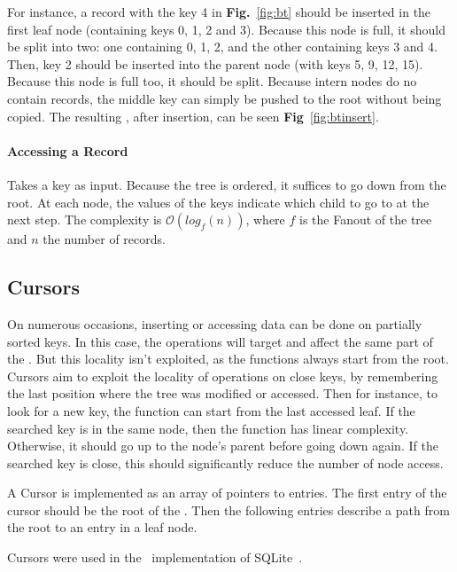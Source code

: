 For instance, a record with the key 4 in \textbf{Fig.}~\ref{fig:bt} should be inserted in the first leaf node (containing keys 0, 1, 2 and 3).
Because this node is full, it should be split into two: one containing 0, 1, 2, and the other containing keys 3 and 4.
Then, key 2 should be inserted into the parent node (with keys 5, 9, 12, 15).
Because this node is full too, it should be split.
Because intern nodes do no contain records, the middle key can simply be pushed to the root without being copied.
The resulting \btree, after insertion, can be seen \textbf{Fig}~\ref{fig:btinsert}.

\paragraph{Accessing a Record} Takes a key as input. Because the tree is ordered, it suffices to go down from the root.
At each node, the values of the keys indicate which child to go to at the next step.
The complexity is $\mathcal{O}(log_{f}(n))$, where $f$ is the Fanout of the tree and $n$ the number of records.

\subsection{Cursors}
On numerous occasions, inserting or accessing data can be done on partially sorted keys.
In this case, the operations will target and affect the same part of the \btree.
But this locality isn't exploited, as the functions always start from the root.
Cursors aim to exploit the locality of operations on close keys, by remembering the last position where the tree was modified or accessed.
Then for instance, to look for a new key, the function can start from the last accessed leaf. If the searched key is in the same node, then the function has linear complexity.
Otherwise, it should go up to the node's parent before going down again. If the searched key is close, this should significantly reduce the number of node access.

A Cursor is implemented as an array of pointers to entries.
The first entry of the cursor should be the root of the \btree.
Then the following entries describe a path from the root to an entry in a leaf node.


\cursor


Cursors were used in the \btrees\ implementation of SQLite~\cite{sqlite}.

